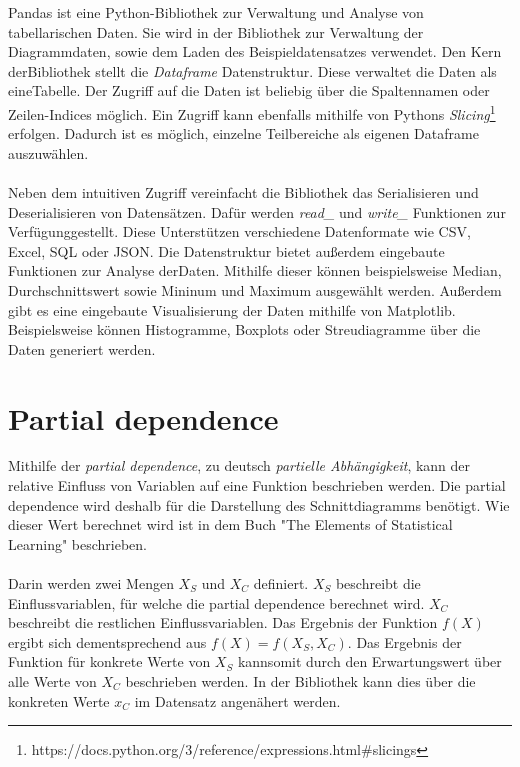 Pandas \parencite{pandas} ist eine Python-Bibliothek zur Verwaltung und Analyse von tabellarischen Daten. Sie wird in der Bibliothek zur Verwaltung der Diagrammdaten, sowie dem Laden des Beispieldatensatzes verwendet. Den Kern der\linebreak Bibliothek stellt die \emph{Dataframe} Datenstruktur. Diese verwaltet die Daten als eine\linebreak Tabelle. Der Zugriff auf die Daten ist beliebig über die Spaltennamen oder Zeilen-Indices möglich. Ein Zugriff kann ebenfalls mithilfe von Pythons \emph{Slicing}\footnote{https://docs.python.org/3/reference/expressions.html\#slicings} erfolgen. Dadurch ist es möglich, einzelne Teilbereiche als eigenen Dataframe auszuwählen.\\\\
\noindent Neben dem intuitiven Zugriff vereinfacht die Bibliothek das Serialisieren und Deserialisieren von Datensätzen. Dafür werden \emph{read\_} und \emph{write\_} Funktionen zur Verfügung\linebreak gestellt. Diese Unterstützen verschiedene Datenformate wie CSV, Excel, SQL oder JSON. Die Datenstruktur bietet außerdem eingebaute Funktionen zur Analyse der\linebreak Daten. Mithilfe dieser können beispielsweise Median, Durchschnittswert sowie Mininum und Maximum ausgewählt werden. Außerdem gibt es eine eingebaute Visualisierung der Daten mithilfe von Matplotlib. Beispielsweise können Histogramme, Boxplots oder Streudiagramme über die Daten generiert werden.



\section{Partial dependence}
\label{sec:partial_dependence}

Mithilfe der \emph{partial dependence}, zu deutsch \emph{partielle Abhängigkeit}, kann der relative Einfluss von Variablen auf eine Funktion beschrieben werden. Die partial dependence wird deshalb für die Darstellung des Schnittdiagramms benötigt. Wie dieser Wert berechnet wird ist in dem Buch "The Elements of
Statistical Learning" \parencite{elements_statistical_learning}\linebreak beschrieben.\\\\
\noindent Darin werden zwei Mengen $X_S$ und $X_C$ definiert. $X_S$ beschreibt die Einflussvariablen, für welche die partial dependence berechnet wird. $X_C$ beschreibt die restlichen Einflussvariablen. Das Ergebnis der Funktion $f(X)$ ergibt sich dementsprechend aus $f(X) = f(X_S, X_C)$. Das Ergebnis der Funktion für konkrete Werte von $X_S$ kann\linebreak somit durch den Erwartungswert über alle Werte von $X_C$ beschrieben werden. In der Bibliothek kann dies über die konkreten Werte $x_C$ im Datensatz angenähert werden.

